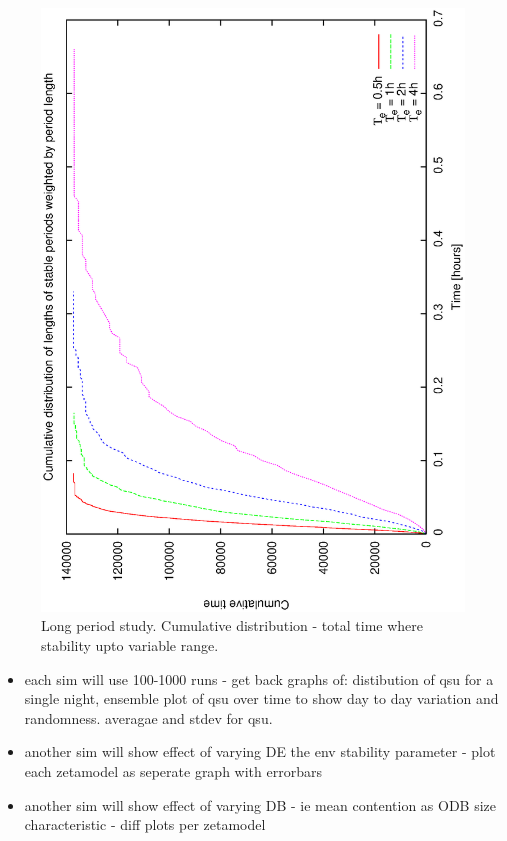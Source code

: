 \begin{figure}[h]
\begin{center}
 \includegraphics[scale=0.5, angle=-90]{figures/e_cumstats.eps}
 \caption[Environmental scenario - cumulative distribution of stable period lengths.] 
   {Long period study. Cumulative distribution - total time where stability upto variable range.}
\end{center} 
\label{fig:env_cumstats}
\end{figure}

\begin{itemize}
\item each sim will use 100-1000 runs - get back graphs of: distibution of qsu for a single night, ensemble plot of qsu over time to show day to day variation and randomness. averagae and stdev for qsu.
\item another sim will show effect of varying DE the env stability parameter - plot each zetamodel as seperate graph with errorbars
\item another sim will show effect of varying DB - ie mean contention as ODB size characteristic - diff plots per zetamodel
\end{itemize}


